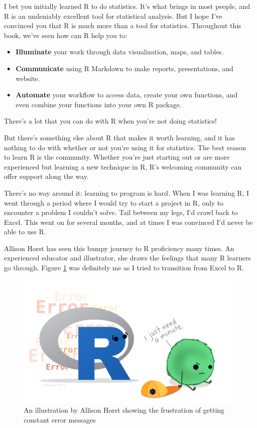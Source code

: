 \documentclass[
]{book}
\providecommand{\tightlist}{%
  \setlength{\itemsep}{0pt}\setlength{\parskip}{0pt}}
\begin{document}
I bet you initially learned R to do statistics. It's what brings in most people, and R is an undeniably excellent tool for statistical analysis. But I hope I've convinced you that R is much more than a tool for statistics. Throughout this book, we've seen how can R help you to:

\begin{itemize}
\tightlist
\item
  \textbf{Illuminate} your work through data visualization, maps, and tables.
\item
  \textbf{Communicate} using R Markdown to make reports, presentations, and website.
\item
  \textbf{Automate} your workflow to access data, create your own functions, and even combine your functions into your own R package.
\end{itemize}

There's a lot that you can do with R when you're not doing statistics!

But there's something else about R that makes it worth learning, and it has nothing to do with whether or not you're using it for statistics. The best reason to learn R is the community. Whether you're just starting out or are more experienced but learning a new technique in R, R's welcoming community can offer support along the way.

There's no way around it: learning to program is hard. When I was learning R, I went through a period where I would try to start a project in R, only to encounter a problem I couldn't solve. Tail between my legs, I'd crawl back to Excel. This went on for several months, and at times I was convinced I'd never be able to use R.

Allison Horst has seen this bumpy journey to R proficiency many times. An experienced educator and illustrator, she draws the feelings that many R learners go through. Figure \ref{fig:errors} was definitely me as I tried to transition from Excel to R.

\begin{figure}
\includegraphics[width=1\linewidth]{assets/errors} \caption{An illustration by Allison Horst showing the frustration of getting constant error messages}\label{fig:errors}
\end{figure}
\end{document}

